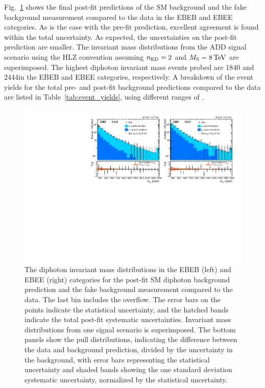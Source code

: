 Fig.~\ref{fig:mgg_post_fit} shows the final post-fit predictions of the SM background and the fake background measurement compared to the data in the EBEB and EBEE categories. As is the case with the pre-fit prediction, excellent agreement is found within the total uncertainty. As expected, the uncertainties on the post-fit prediction are smaller. The invariant mass distributions from the ADD signal scenario using the HLZ convention assuming $n_{\rm ED}=2$ and $M_{\rm S}=8\,\text{Te\hspace{-.08em}V}$ are superimposed. The highest diphoton invariant mass events probed are 1840 and 2444\GeV in the EBEB and EBEE categories, respectively. A breakdown of the event yields for the total pre- and post-fit background predictions compared to the data are listed in Table~\ref{tab:event_yields}, using different ranges of \mgg.

\begin{figure}[!htbp]
  \centering
  \includegraphics[width=1.0\textwidth]{figures/PLOT_PRED_PULL_35p9_1_no_clockwork.pdf}
  \caption{The diphoton invariant mass distributions in the EBEB (left) and EBEE (right) categories for the post-fit SM diphoton background prediction and the fake background measurement compared to the data. The last bin includes the overflow. The error bars on the points indicate the statistical uncertainty, and the hatched bands indicate the total post-fit systematic uncertainties. Invariant mass distributions from one signal scenario is superimposed. The bottom panels show the pull distributions, indicating the difference between the data and background prediction, divided by the uncertainty in the background, with error bars representing the statistical uncertainty and shaded bands showing the one standard deviation systematic uncertainty, normalized by the statistical uncertainty.}
  \label{fig:mgg_post_fit}
\end{figure}

